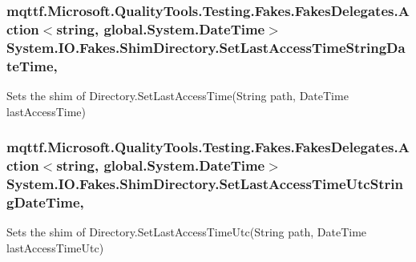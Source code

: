 \hypertarget{class_system_1_1_i_o_1_1_fakes_1_1_shim_directory_afacc7119ba0187ff06e5199c2dd9f7f4}{
\subsubsection[{Set\-Last\-Access\-Time\-String\-Date\-Time}]{\setlength{\rightskip}{0pt plus 5cm}mqttf.\-Microsoft.\-Quality\-Tools.\-Testing.\-Fakes.\-Fakes\-Delegates.\-Action$<$string, global.\-System.\-Date\-Time$>$ System.\-I\-O.\-Fakes.\-Shim\-Directory.\-Set\-Last\-Access\-Time\-String\-Date\-Time\hspace{0.3cm}{\ttfamily [static]}, {\ttfamily [set]}}}\label{class_system_1_1_i_o_1_1_fakes_1_1_shim_directory_afacc7119ba0187ff06e5199c2dd9f7f4}


Sets the shim of Directory.\-Set\-Last\-Access\-Time(\-String path, Date\-Time last\-Access\-Time)

\hypertarget{class_system_1_1_i_o_1_1_fakes_1_1_shim_directory_a0bdb60a4f254837361b282ab11172132}{
\subsubsection[{Set\-Last\-Access\-Time\-Utc\-String\-Date\-Time}]{\setlength{\rightskip}{0pt plus 5cm}mqttf.\-Microsoft.\-Quality\-Tools.\-Testing.\-Fakes.\-Fakes\-Delegates.\-Action$<$string, global.\-System.\-Date\-Time$>$ System.\-I\-O.\-Fakes.\-Shim\-Directory.\-Set\-Last\-Access\-Time\-Utc\-String\-Date\-Time\hspace{0.3cm}{\ttfamily [static]}, {\ttfamily [set]}}}\label{class_system_1_1_i_o_1_1_fakes_1_1_shim_directory_a0bdb60a4f254837361b282ab11172132}


Sets the shim of Directory.\-Set\-Last\-Access\-Time\-Utc(\-String path, Date\-Time last\-Access\-Time\-Utc)

